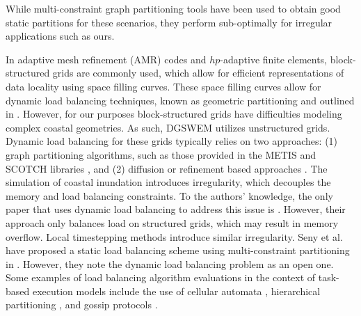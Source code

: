 While multi-constraint graph partitioning tools have been used to obtain good static partitions for these scenarios, they perform sub-optimally for irregular applications such as ours.

In adaptive mesh refinement (AMR) codes and $hp$-adaptive finite elements, block-structured grids are commonly used, which allow for efficient representations of data locality using space filling curves. These space filling curves allow for dynamic load balancing techniques, known as geometric partitioning and outlined in \cite{Devine2005,Burstedde2011,Blaise2012,Ferreira2017}. However, for our purposes block-structured grids have difficulties modeling complex coastal geometries. As such, DGSWEM utilizes unstructured grids. Dynamic load balancing for these grids typically relies on two approaches: (1) graph partitioning algorithms, such as those provided in the METIS and SCOTCH libraries \cite{scotch,Bhatele2012,Karypis1998,Devine2005,Aykanat2007}, and (2) diffusion or refinement based approaches \cite{Schloegel1997}.
The simulation of coastal inundation introduces irregularity, which decouples the memory and load balancing constraints.
To the authors' knowledge, the only paper that uses dynamic load balancing to address this issue is \cite{Asuncion2016}. However, their approach only balances load on structured grids, which may result in memory overflow.
Local timestepping methods introduce similar irregularity.
Seny et al. have proposed a static load balancing scheme using multi-constraint partitioning in \cite{Seny2014}.
However, they note the dynamic load balancing problem as an open one.
Some examples of load balancing algorithm evaluations in the context of task-based execution models include the use of cellular automata \cite{Hosoori2011}, hierarchical partitioning \cite{Zheng2010}, and gossip protocols \cite{Menon2013}.